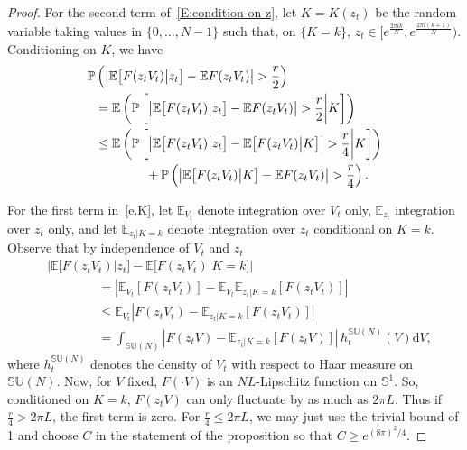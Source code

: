 \documentclass[11pt]{article}
\theoremstyle{definition}
\numberwithin{equation}{section}
\numberwithin{figure}{section}
\numberwithin{table}{section}
\newcommand{\SUnitary}[1]{\mathbb{SU}\left(#1\right)}
\newcommand{\Circle}{\mathbb{S}^1}
\newcommand{\E}{\mathbb{E}}
\newcommand{\Prob}{\mathbb{P}}
\newcommand*{\dd}{\mathrm{d}}
\newcommand*{\dV}{\dd V}
\begin{document}
\begin{proof}
For the second term of~\eqref{E:condition-on-z}, let $K=K(z_t)$ be the random variable taking values in $\{0,\ldots,N-1\}$ such that, on $\{K=k\}$, $z_t\in [e^{\frac{2\pi ik}{N}},e^{\frac{2\pi i(k+1)}{N}})$. Conditioning on $K$, we have
\begin{align}
\notag\Prob&\left(\left|\E\big[F(z_tV_t)\big|z_t\big]-\E F(z_tV_t)\right|>\frac{r}{2}\right)\\
&\notag=\E\left(\Prob\left[\left|\E\big[F(z_tV_t)\big|z_t\big] -\E F(z_tV_t)\right|>\frac{r}{2}\bigg|K\right]\right)\\
&\label{e.K}
\le\E\left(\Prob\left[\left|\E\big[F(z_tV_t)\big|z_t\big] -\E \big[F(z_tV_t)\big|K\big]\right|>\frac{r}{4}\bigg|K\right]\right)\\
&\notag\qquad\qquad+\Prob\left(\left|\E\big[F(z_tV_t)\big|K\big] -\E F(z_tV_t)\right|>\frac{r}{4}\right).
\end{align}

For the first term in~\eqref{e.K}, let $\E_{V_t}$ denote integration over $V_t$ only, $\E_{z_t}$ integration over $z_t$ only, and let $\E_{z_t|K=k}$ denote integration over $z_t$ conditional on $K=k$. Observe that by independence of $V_t$ and $z_t$
\begin{align*}
&\left|\E\big[F(z_tV_t)\big|z_t\big] -\E \big[F(z_tV_t)\big|K=k\big]\right|\\&\qquad\qquad=\left|\E_{V_t}\left[F(z_tV_t)\right]-\E_{V_t}\E_{z_t|K=k}\left[F(z_tV_t)\right]\right|\\&\qquad\qquad\le\E_{V_t}\left|F(z_tV_t)-\E_{z_t|K=k}\left[F(z_tV_t)\right]\right| \\
&\qquad\qquad= \int_{\SUnitary{N}} |F(z_tV) - \mathbb{E}_{z_t|K=k}[F(z_t V)]| \,h^{\SUnitary{N}}_t(V)\dV,
\end{align*}
where $h^{\SUnitary{N}}_t$ denotes the density of $V_t$ with respect to Haar measure on $\SUnitary{N}$. Now, for $V$ fixed, $F(\cdot V)$ is an $NL$-Lipschitz function on $\Circle$. So, conditioned on $K=k$, $F(z_tV)$ can only fluctuate by as much as $2\pi L$. Thus if $\frac{r}{4}>2\pi L$, the first term is zero. For $\frac{r}{4}\le2\pi L$, we may just use the trivial bound of 1 and choose $C$ in the statement of the proposition so that $C\ge e^{(8\pi)^2/4}$.


\end{proof}
\end{document}
